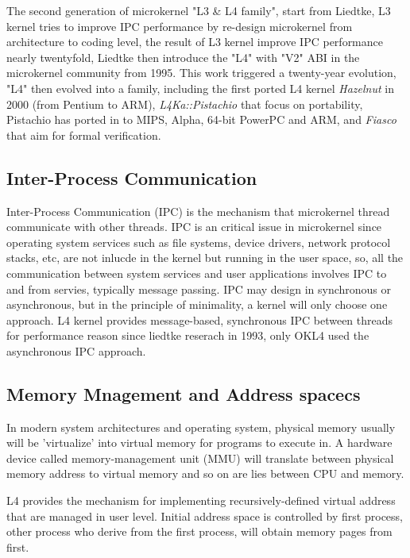 \documentclass[10pt,preprint,nocopyrightspace]{sigplanconf}
\begin{document}
The second generation of microkernel "L3 \& L4 family", start from Liedtke\cite{liedtke1993improving}, L3 kernel tries to improve IPC performance by re-design microkernel from architecture to coding level, the result of L3 kernel improve IPC performance nearly twentyfold, Liedtke then introduce the "L4" with "V2" ABI in the microkernel community from 1995\cite{liedtke1995u}. This work triggered a twenty-year evolution, "L4" then evolved into a family, including the first ported L4 kernel \textit{Hazelnut} in 2000 (from Pentium to ARM), \textit{L4Ka::Pistachio} that focus on portability, Pistachio has ported in to MIPS, Alpha, 64-bit PowerPC and ARM, and \textit{Fiasco} that aim for formal verification. 

\subsection{Inter-Process Communication}

Inter-Process Communication (IPC) is the mechanism that microkernel thread communicate with other threads\cite{liedtke1993improving}. IPC is an critical issue in microkernel since operating system services such as file systems, device drivers, network protocol stacks, etc, are not inlucde in the kernel but running in the user space, so, all the communication between system services and user applications involves IPC to and from servies\cite{iqbal2010overview}, typically message passing. IPC may design in synchronous or asynchronous, but in the principle of minimality, a kernel will only choose one approach. L4 kernel provides message-based, synchronous IPC between threads for performance reason since liedtke reserach in 1993\cite{liedtke1993improving}, only OKL4 used the asynchronous IPC approach\cite{elphinstone2013l3}.

\subsection{Memory Mnagement and Address spacecs }

In modern system architectures and operating system, physical memory usually will be 'virtualize' into virtual memory for programs to execute in\cite{arpaci2015operating}. A hardware device called memory-management unit (MMU) will translate between physical memory address to virtual memory and so on are lies between CPU and memory.

L4 provides the mechanism for implementing recursively-defined virtual address that are managed in user level\cite{dannowski2011l4}. Initial address space is controlled by first process, other process who derive from the first process, will obtain memory pages from first.
\end{document}
